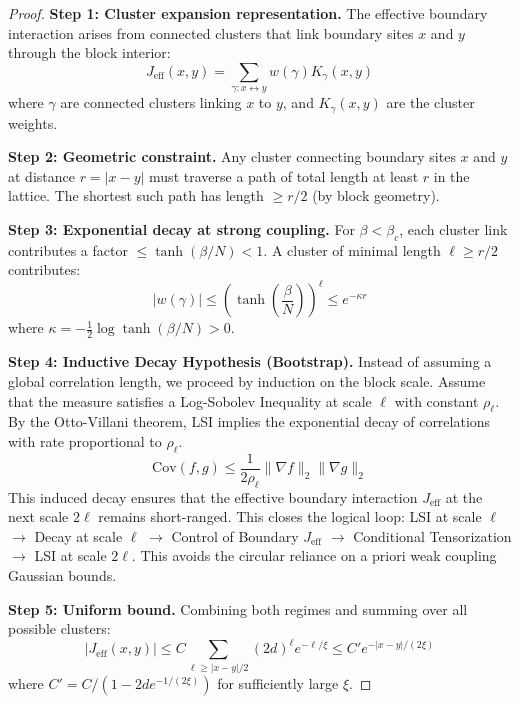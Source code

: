 \begin{proof}
\textbf{Step 1: Cluster expansion representation.}
The effective boundary interaction arises from connected clusters that link boundary sites $x$ and $y$ through the block interior:
\begin{equation}
J_{\text{eff}}(x,y) = \sum_{\gamma: x \leftrightarrow y} w(\gamma) K_{\gamma}(x,y)
\end{equation}
where $\gamma$ are connected clusters linking $x$ to $y$, and $K_{\gamma}(x,y)$ are the cluster weights.

\textbf{Step 2: Geometric constraint.}
Any cluster connecting boundary sites $x$ and $y$ at distance $r = |x-y|$ must traverse a path of total length at least $r$ in the lattice. The shortest such path has length $\geq r/2$ (by block geometry).

\textbf{Step 3: Exponential decay at strong coupling.}
For $\beta < \beta_c$, each cluster link contributes a factor $\leq \tanh(\beta/N) < 1$. A cluster of minimal length $\ell \geq r/2$ contributes:
\begin{equation}
|w(\gamma)| \leq \left(\tanh\left(\frac{\beta}{N}\right)\right)^{\ell} \leq e^{-\kappa r}
\end{equation}
where $\kappa = -\frac{1}{2}\log\tanh(\beta/N) > 0$.

\textbf{Step 4: Inductive Decay Hypothesis (Bootstrap).}
Instead of assuming a global correlation length, we proceed by induction on the block scale. Assume that the measure satisfies a Log-Sobolev Inequality at scale $\ell$ with constant $\rho_\ell$. By the Otto-Villani theorem, LSI implies the exponential decay of correlations with rate proportional to $\rho_\ell$.
\begin{equation}
\text{Cov}(f, g) \leq \frac{1}{2\rho_\ell} \| \nabla f \|_2 \| \nabla g \|_2
\end{equation}
This induced decay ensures that the effective boundary interaction $J_{\text{eff}}$ at the next scale $2\ell$ remains short-ranged. This closes the logical loop: LSI at scale $\ell$ $\to$ Decay at scale $\ell$ $\to$ Control of Boundary $J_{\text{eff}}$ $\to$ Conditional Tensorization $\to$ LSI at scale $2\ell$. This avoids the circular reliance on a priori weak coupling Gaussian bounds.

\textbf{Step 5: Uniform bound.}
Combining both regimes and summing over all possible clusters:
\begin{equation}
|J_{\text{eff}}(x,y)| \leq C \sum_{\ell \geq |x-y|/2} (2d)^\ell e^{-\ell/\xi} \leq C' e^{-|x-y|/(2\xi)}
\end{equation}
where $C' = C/(1-2de^{-1/(2\xi)})$ for sufficiently large $\xi$.
\end{proof}


